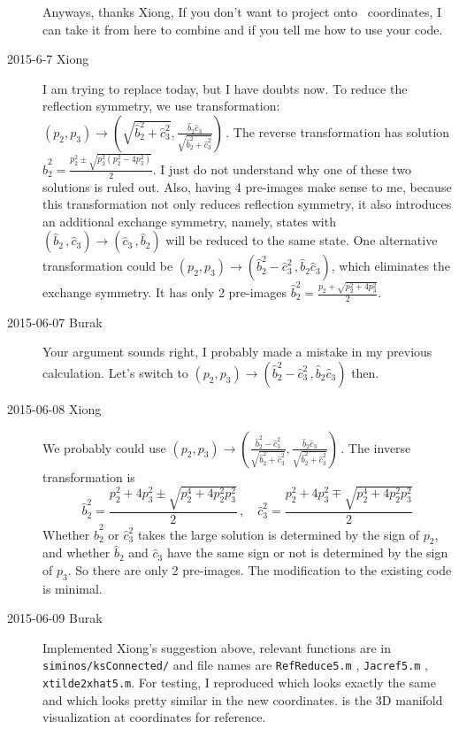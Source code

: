 \begin{description}
Anyways, thanks Xiong, If you don't want to project onto \statesp\
coordinates, I can take it from here to combine 
and \reffig{f-ksppo1rpo2} if you tell me how to use your code.

\item[2015-6-7 Xiong]
I am trying to replace  today, but I have
doubts now. To reduce the reflection symmetry, we use
transformation:
$(p_2, p_3) \to  \left(\sqrt{\hat{b}_2^2 + \hat{c}_3^2},
     \frac{\hat{b}_2 \hat{c}_3}{\sqrt{\hat{b}_2^2 + \hat{c}_3^2}}
   \right)\, .
$
The reverse transformation has solution
$\hat{b}_2^2 = \frac{p_2^2 \pm \sqrt{p_2^2 (p_2^2 - 4 p_3^2)}}{2}$.
I just do not understand why one of these two solutions is ruled
out. Also, having 4 pre-images make sense to me, because this
transformation not only reduces reflection symmetry, it also
introduces an additional exchange symmetry, namely, states
with $(\hat{b}_2\,,\hat{c}_3) \to (\hat{c}_3\,,\hat{b}_2)$ will be
reduced to the same state. One alternative transformation could be
$(p_2, p_3) \to  \left(\hat{b}_2^2 - \hat{c}_3^2 \,, \hat{b}_2 \hat{c}_3
   \right)
$, which eliminates the exchange symmetry. It has only 2 pre-images
$\hat{b}_2^2 = \frac{p_2 + \sqrt{p_2^2 + 4 p_3^2}}{2}$.

\item[2015-06-07 Burak] Your argument sounds right, I probably made
a mistake in my previous calculation. Let's switch to
$(p_2, p_3) \to  \left(\hat{b}_2^2 - \hat{c}_3^2 \,, \hat{b}_2 \hat{c}_3
\right)$ then.

\item[2015-06-08 Xiong] We probably could use
$(p_2, p_3) \to
\left(\frac{\hat{b}_2^2 - \hat{c}_3^2}{\sqrt{\hat{b}_2^2 + \hat{c}_3^2}},
     \frac{\hat{b}_2 \hat{c}_3}{\sqrt{\hat{b}_2^2 + \hat{c}_3^2}}
   \right)\, .
$
The inverse transformation is
\[
\hat{b}_2^2 = \frac{p_2^2 + 4p_3^2 \pm \sqrt{p_2^4+4p_2^2p_3^2}}{2} \,,\quad
\hat{c}_3^2 = \frac{p_2^2 + 4p_3^2 \mp \sqrt{p_2^4+4p_2^2p_3^2}}{2}
\]
Whether $\hat{b}_2^2$ or $\hat{c}_3^2$ takes the large solution is
determined by the sign of $p_2$, and whether $\hat{b}_2$ and $\hat{c}_3$
have the same sign or not is determined by the sign of
$p_3$. So there are only 2 pre-images. The modification to the
existing code is minimal.

\item[2015-06-09 Burak] Implemented Xiong's suggestion above, relevant
functions are in \texttt{siminos/ksConnected/} and file names are
\texttt{RefReduce5.m} ,
\texttt{Jacref5.m} ,
\texttt{xtilde2xhat5.m}.
For testing, I reproduced
 which looks exactly the same
and  which looks pretty similar in the new
coordinates. \refFig{f-ksPPO1man3D3} is the 3D manifold visualization
at coordinates for reference.
\end{description}

